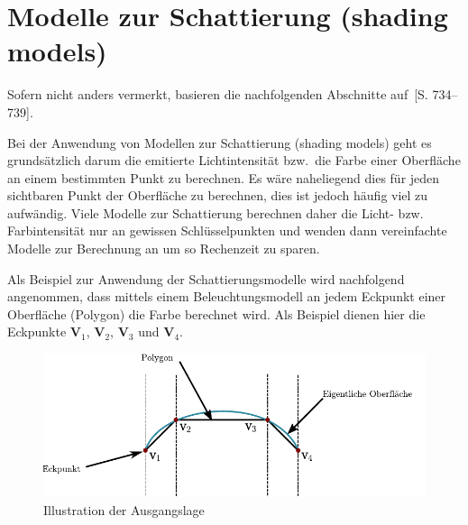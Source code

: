 
\section{Modelle zur Schattierung (shading models)}
\label{sec:shading}


Sofern nicht anders vermerkt, basieren die nachfolgenden Abschnitte
auf~\cite{foley_computer_1996}[S. 734–739].

Bei der Anwendung von Modellen zur Schattierung (shading models) geht es
grundsätzlich darum die emitierte Lichtintensität bzw.\ die Farbe einer
Oberfläche an einem bestimmten Punkt zu berechnen. Es wäre naheliegend
dies für jeden sichtbaren Punkt der Oberfläche zu berechnen, dies ist
jedoch häufig viel zu aufwändig. Viele Modelle zur Schattierung
berechnen daher die Licht- bzw. Farbintensität nur an gewissen
Schlüsselpunkten und wenden dann vereinfachte Modelle zur Berechnung an
um so Rechenzeit zu sparen.

Als Beispiel zur Anwendung der Schattierungsmodelle wird nachfolgend
angenommen, dass mittels einem Beleuchtungsmodell an jedem Eckpunkt einer
Oberfläche (Polygon) die Farbe berechnet wird. Als Beispiel dienen hier die
Eckpunkte $\bm{V}_{1}$, $\bm{V}_{2}$, $\bm{V}_{3}$ und $\bm{V}_{4}$.

\begin{figure}[H]
    \centering
    \includegraphics{img/shading_mesh.pdf}
    \caption{Illustration der Ausgangslage\protect\footnotemark}\label{
        fig:shading_mesh_illustration}
\end{figure}

